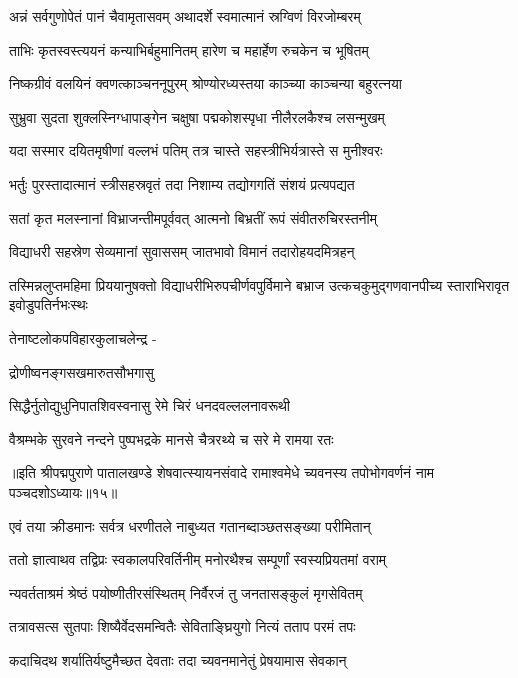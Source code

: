 \twolineshloka
{अन्नं सर्वगुणोपेतं पानं चैवामृतासवम्}
{अथादर्शे स्वमात्मानं स्रग्विणं विरजोम्बरम्}%

\twolineshloka
{ताभिः कृतस्वस्त्ययनं कन्याभिर्बहुमानितम्}
{हारेण च महार्हेण रुचकेन च भूषितम्}%

\twolineshloka
{निष्कग्रीवं वलयिनं क्वणत्काञ्चननूपुरम्}
{श्रोण्योरध्यस्तया काञ्च्या काञ्चन्या बहुरत्नया}%

\twolineshloka
{सुभ्रुवा सुदता शुक्लस्निग्धापाङ्गेन चक्षुषा}
{पद्मकोशस्पृधा नीलैरलकैश्च लसन्मुखम्}%

\twolineshloka
{यदा सस्मार दयितमृषीणां वल्लभं पतिम्}
{तत्र चास्ते सहस्त्रीभिर्यत्रास्ते स मुनीश्वरः}%

\twolineshloka
{भर्तुः पुरस्तादात्मानं स्त्रीसहस्रवृतं तदा}
{निशाम्य तद्योगगतिं संशयं प्रत्यपद्यत}%

\twolineshloka
{सतां कृत मलस्नानां विभ्राजन्तीमपूर्ववत्}
{आत्मनो बिभ्रतीं रूपं संवीतरुचिरस्तनीम्}%

\twolineshloka
{विद्याधरी सहस्रेण सेव्यमानां सुवाससम्}
{जातभावो विमानं तदारोहयदमित्रहन्}%

\fourlineindentedshloka
{तस्मिन्नलुप्तमहिमा प्रिययानुषक्तो}
{विद्याधरीभिरुपचीर्णवपुर्विमाने}
{बभ्राज उत्कचकुमुद्गणवानपीच्य}
{स्ताराभिरावृत इवोडुपतिर्नभःस्थः}%

तेनाष्टलोकपविहारकुलाचलेन्द्र -

द्रोणीष्वनङ्गसखमारुतसौभगासु

\twolineshloka
{सिद्धैर्नुतोद्युधुनिपातशिवस्वनासु}
{रेमे चिरं धनदवल्ललनावरूथी}%

\twolineshloka
{वैश्रम्भके सुरवने नन्दने पुष्पभद्रके}
{मानसे चैत्ररथ्ये च सरे मे रामया रतः}%

॥इति श्रीपद्मपुराणे पातालखण्डे शेषवात्स्यायनसंवादे रामाश्वमेधे च्यवनस्य तपोभोगवर्णनं नाम पञ्चदशोऽध्यायः॥१५॥



\twolineshloka
{एवं तया क्रीडमानः सर्वत्र धरणीतले}
{नाबुध्यत गतानब्दाञ्छतसङ्ख्या परीमितान्}%

\twolineshloka
{ततो ज्ञात्वाथव तद्विप्रः स्वकालपरिवर्तिनीम्}
{मनोरथैश्च सम्पूर्णां स्वस्यप्रियतमां वराम्}%

\twolineshloka
{न्यवर्तताश्रमं श्रेष्ठं पयोष्णीतीरसंस्थितम्}
{निर्वैरजं तु जनतासङ्कुलं मृगसेवितम्}%

\twolineshloka
{तत्रावसत्स सुतपाः शिष्यैर्वेदसमन्वितैः}
{सेविताङ्घ्रियुगो नित्यं तताप परमं तपः}%

\twolineshloka
{कदाचिदथ शर्यातिर्यष्टुमैच्छत देवताः}
{तदा च्यवनमानेतुं प्रेषयामास सेवकान्}%

